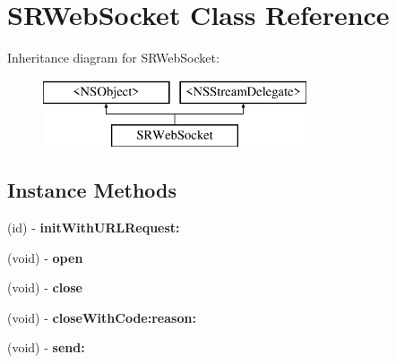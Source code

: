 \hypertarget{interface_s_r_web_socket}{\section{S\-R\-Web\-Socket Class Reference}
\label{interface_s_r_web_socket}
}
Inheritance diagram for S\-R\-Web\-Socket\-:\begin{figure}[H]
\begin{center}
\leavevmode
\includegraphics[height=2.000000cm]{interface_s_r_web_socket}
\end{center}
\end{figure}
\subsection*{Instance Methods}
\begin{DoxyCompactItemize}
\item 
\hypertarget{interface_s_r_web_socket_aac7f9f83edcc588891363ed59fb2d968}{(id) -\/ {\bfseries init\-With\-U\-R\-L\-Request\-:}}\label{interface_s_r_web_socket_aac7f9f83edcc588891363ed59fb2d968}

\item 
\hypertarget{interface_s_r_web_socket_af25a2a76e6022874f3f0257bb0ed29e5}{(void) -\/ {\bfseries open}}\label{interface_s_r_web_socket_af25a2a76e6022874f3f0257bb0ed29e5}

\item 
\hypertarget{interface_s_r_web_socket_aec4acc077ac609a2bcc15757405011e0}{(void) -\/ {\bfseries close}}\label{interface_s_r_web_socket_aec4acc077ac609a2bcc15757405011e0}

\item 
\hypertarget{interface_s_r_web_socket_a097e65eba8218792d72aa07942e64508}{(void) -\/ {\bfseries close\-With\-Code\-:reason\-:}}\label{interface_s_r_web_socket_a097e65eba8218792d72aa07942e64508}

\item 
\hypertarget{interface_s_r_web_socket_a836eff14635070907f4a72cd5c9c4a47}{(void) -\/ {\bfseries send\-:}}\label{interface_s_r_web_socket_a836eff14635070907f4a72cd5c9c4a47}

\end{DoxyCompactItemize}
